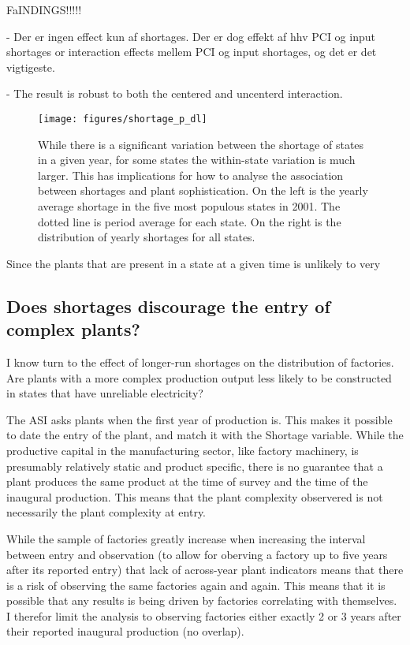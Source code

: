 \documentclass[11pt]{article}
\begin{document}
FaINDINGS!!!!!

- Der er ingen effect kun af shortages. Der er dog effekt af hhv PCI og input shortages or interaction effects mellem PCI og input shortages, og det er det vigtigeste.

- The result is robust to both the centered and uncenterd interaction.

\begin{figure}[htpb]
	\centering
	\texttt{[image: figures/shortage\_p\_dl]}
	\caption{While there is a significant variation between the shortage of states in a given year, for some states the within-state variation is much larger. This has implications for how to analyse the association between shortages and plant sophistication. On the left is the yearly average shortage in the five most populous states in 2001. The dotted line is period average for each state. On the right is the distribution of yearly shortages for all states.}%
	\label{fig:shortage_dist}
\end{figure}

Since the plants that are present in a state at a given time is unlikely to very

\subsection{Does shortages discourage the entry of complex plants?}%
\label{sub:longterm}

I know turn to the effect of longer-run shortages on the distribution of factories. Are plants with a more complex production output less likely to be constructed in states that have unreliable electricity? 

The ASI asks plants when the first year of production is. This makes it possible to date the entry of the plant, and match it with the Shortage variable. While the productive capital in the manufacturing sector, like factory machinery, is presumably relatively static and product specific, there is no guarantee that a plant produces the same product at the time of survey and the time of the inaugural production. This means that the plant complexity observered is not necessarily the plant complexity at entry.

While the sample of factories greatly increase when increasing the interval between entry and observation (to allow for oberving a factory up to five years after its reported entry) that lack of across-year plant indicators means that there is a risk of observing the same factories again and again. This means that it is possible that any results is being driven by factories correlating with themselves. I therefor limit the analysis to observing factories either exactly 2 or 3 years after their reported inaugural production (no overlap). 
\end{document}
